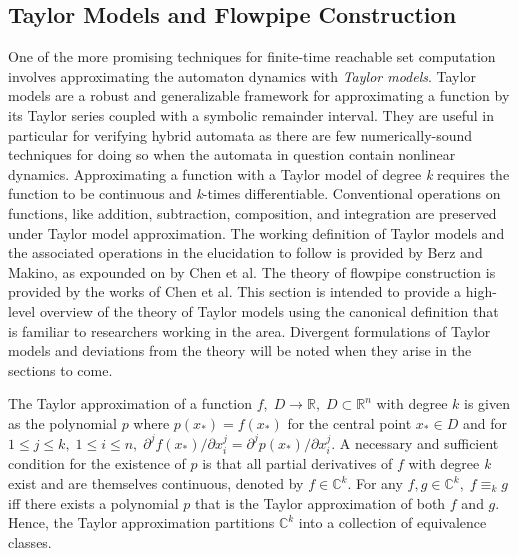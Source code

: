 \subsection{Taylor Models and Flowpipe Construction}

One of the more promising techniques for finite-time reachable set computation involves approximating the automaton dynamics with \textit{Taylor models}. Taylor models are a robust and generalizable framework for approximating a function by its Taylor series coupled with a symbolic remainder interval. They are useful in particular for verifying hybrid automata as there are few numerically-sound techniques for doing so when the automata in question contain nonlinear dynamics. Approximating a function with a Taylor model of degree \textit{k} requires the function to be continuous and \textit{k}-times differentiable. Conventional operations on functions, like addition, subtraction, composition, and integration are preserved under Taylor model approximation. The working definition of Taylor models and the associated operations in the elucidation to follow is provided by Berz and Makino, as expounded on by Chen et al. The theory of flowpipe construction is provided by the works of Chen et al. This section is intended to provide a high-level overview of the theory of Taylor models using the canonical definition that is familiar to researchers working in the area. Divergent formulations of Taylor models and deviations from the theory will be noted when they arise in the sections to come.  %

The Taylor approximation of a function $f, \; D \rightarrow \mathbb{R}, \; D \subset \mathbb{R}^n$ with degree $k$ is given as the polynomial $p$ where $p(x_{*}) = f(x_{*})$ for the central point $x_{*} \in D$ and for $1 \leq j \leq k, \; 1 \leq i \leq n, \; \partial^j f(x_{*}) / \partial x^j_i = \partial^j p(x_{*}) / \partial x^j_i$. A necessary and sufficient condition for the existence of $p$ is that all partial derivatives of $f$ with degree \textit{k} exist and are themselves continuous, denoted by $f \in \mathbb{C}^k$. For any $f, g \in \mathbb{C}^k, \; f \equiv_k g$ iff there exists a polynomial $p$ that is the Taylor approximation of both $f$ and $g$. Hence, the Taylor approximation partitions $\mathbb{C}^k$ into a collection of equivalence classes.

